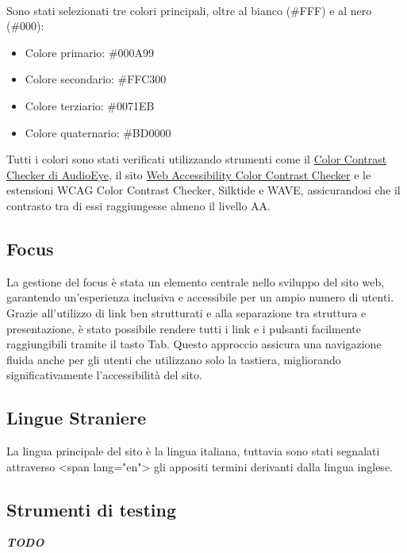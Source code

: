 \\
Sono stati selezionati tre colori principali, oltre al bianco (\#FFF) e al nero (\#000):
\begin{itemize}
    \item Colore primario: \#000A99
    \item Colore secondario: \#FFC300
    \item Colore terziario: \#0071EB
    \item Colore quaternario: \#BD0000
\end{itemize}
Tutti i colori sono stati verificati utilizzando strumenti come il \href{https://www.audioeye.com/color-contrast-checker/}{Color Contrast Checker di AudioEye}, il sito \href{https://accessibleweb.com/color-contrast-checker/}{Web Accessibility Color Contrast Checker} e le estensioni WCAG Color Contrast Checker, Silktide e WAVE, assicurandosi che il contrasto tra di essi raggiungesse almeno il livello AA.
\subsection{Focus}
La gestione del focus è stata un elemento centrale nello sviluppo del sito web, garantendo un’esperienza inclusiva e accessibile per un ampio numero di utenti. Grazie all’utilizzo di link ben strutturati e alla separazione tra struttura e presentazione, è stato possibile rendere tutti i link e i pulsanti facilmente raggiungibili tramite il tasto Tab. Questo approccio assicura una navigazione fluida anche per gli utenti che utilizzano solo la tastiera, migliorando significativamente l’accessibilità del sito.
\subsection{Lingue Straniere}
La lingua principale del sito è la lingua italiana, tuttavia sono stati segnalati attraverso <span lang="en"> gli appositi termini derivanti dalla lingua inglese.
\subsection{Strumenti di testing}
\textbf{\textit{TODO}}
